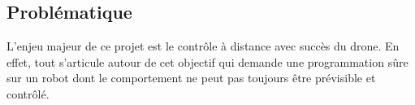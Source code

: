 \subsection{Problématique}
L'enjeu majeur de ce projet est le contrôle à distance avec succès du drone. En effet, tout s'articule autour de cet objectif qui demande une programmation sûre sur un robot dont le comportement ne peut pas toujours être prévisible et contrôlé.